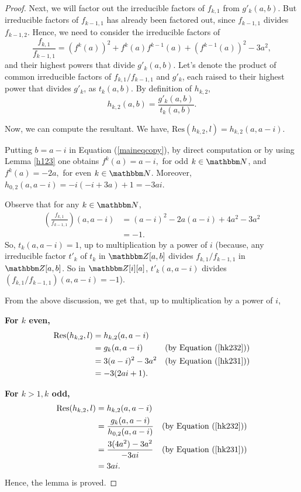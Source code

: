\documentclass[reqno]{amsart}
\renewcommand{\eqref}[1]{(\ref{#1})}
\numberwithin{equation}{section}
\theoremstyle{plain}
\theoremstyle{definition}
\theoremstyle{definition}
\newcommand{\Z}{{\mathbbm Z}}
\newcommand{\N}{{\mathbbm N}}
\begin{document}
\begin{proof}
        Next, we will factor out the irreducible factors of $f_{k,1}$ from $g'_{k}(a,b)$. But irreducible factors of $f_{k-1,1}$ has already been factored out, since $f_{k-1,1}$ divides $f_{k-1,2}$. Hence, we need to consider the irreducible factors of 
        \begin{equation}\label{5.10}
            \frac{f_{k,1}}{f_{k-1,1}}=(f^{k}(a))^{2}+f^{k}(a)f^{k-1}(a)+(f^{k-1}(a))^{2}-3a^{2},
        \end{equation}
        and their highest powers that divide $g'_{k}(a,b)$. Let's denote the product of common irreducible factors of $f_{k,1}/f_{k-1,1}$ and $g'_{k}$, each raised to their highest power that divides $g'_{k}$, as $t_{k}(a,b)$. By definition of $h_{k,2}$,
        \begin{equation}\label{hk233}
            h_{k,2}(a,b) = \frac{g'_{k}(a,b)}{t_{k}(a,b)}.
        \end{equation}

        Now, we can compute the resultant. We have, $\mbox{Res}(h_{k,2},l)=h_{k,2}(a,a-i)$.

        Putting $b=a-i$ in Equation \eqref{maineqcopy}, by direct computation or by using Lemma \ref{h123} one obtains $f^{k}(a)=a-i, $ for odd $k\in \N$, and $f^{k}(a)=-2a, $ for even $k\in \N$. Moreover, $h_{0,2}(a,a-i)= -i(-i+3a)+1=-3ai$.

        Observe that for any $k\in \N$,
        \begin{align*}
            \left(\frac{f_{k,1}}{f_{k-1,1}}\right)(a,a-i) & = (a-i)^{2}-2a(a-i)+4a^{2}-3a^{2}\\
            & =-1.
        \end{align*}
        So, $t_{k}(a,a-i)=1$, up to multiplication by a power of $i$ (because, any irreducible factor $t'_{k}$ of $t_{k}$ in $\Z[a,b]$ divides $f_{k,1}/f_{k-1,1}$ in $\Z[a,b]$. So in $\Z[i][a]$, $t'_{k}(a,a-i)$ divides $(f_{k,1}/f_{k-1,1})(a,a-i)=-1$).

        From the above discussion, we get that, up to multiplication by a power of $i$,

        \textbf{For $k$ even,}
        \begin{align*}
            \mbox{Res}(h_{k,2},l) & =h_{k,2}(a,a-i) & \\
            & = g_{k}(a,a-i) & (\mbox{by Equation }\eqref{hk232})\\
            & = 3(a-i)^{2}-3a^{2} & (\mbox{by Equation }\eqref{hk231})\\
            & =-3(2ai+1). & 
        \end{align*}
        
        \textbf{For $k> 1, k$ odd,}
        \begin{align*}
            \mbox{Res}(h_{k,2},l) & = h_{k,2}(a,a-i) & \\
            & = \frac{g_{k}(a,a-i)}{h_{0,2}(a,a-i)} & (\mbox{by Equation }\eqref{hk232})\\
            & =\frac{3(4a^{2})-3a^{2}}{-3ai} & (\mbox{by Equation }\eqref{hk231})\\
            & = 3ai. & 
        \end{align*}
        Hence, the lemma is proved.
    \end{proof}
\end{document}

